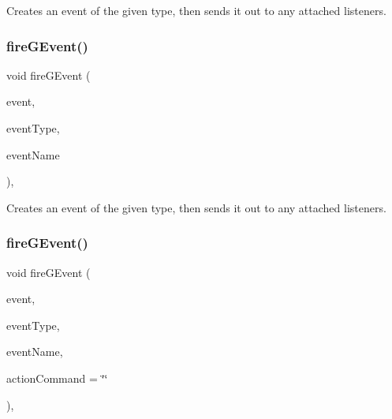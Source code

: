Creates an event of the given type, then sends it out to any attached listeners. 

\mbox{\label{classsgl_1_1GObservable_abb0b2f66ba39211cb5d7615e9d1c04e2}} 
\subsubsection{\texorpdfstring{fire\+G\+Event()}{fireGEvent()}\hspace{0.1cm}{\footnotesize\ttfamily [3/8]}}
{\footnotesize\ttfamily void fire\+G\+Event (\begin{DoxyParamCaption}\item[{Q\+Key\+Event $\ast$}]{event,  }\item[{\mbox{\hyperlink{namespacesgl_a2628ea8d12e8b2563c32f05dc7fff6fa}{Event\+Type}}}]{event\+Type,  }\item[{const std\+::string \&}]{event\+Name }\end{DoxyParamCaption})\hspace{0.3cm}{\ttfamily [protected]}, {\ttfamily [virtual]}}



Creates an event of the given type, then sends it out to any attached listeners. 

\mbox{\label{classsgl_1_1GObservable_a119318675d2165bdf7dd853aaf881d4b}} 
\subsubsection{\texorpdfstring{fire\+G\+Event()}{fireGEvent()}\hspace{0.1cm}{\footnotesize\ttfamily [4/8]}}
{\footnotesize\ttfamily void fire\+G\+Event (\begin{DoxyParamCaption}\item[{Q\+Mouse\+Event $\ast$}]{event,  }\item[{\mbox{\hyperlink{namespacesgl_a2628ea8d12e8b2563c32f05dc7fff6fa}{Event\+Type}}}]{event\+Type,  }\item[{const std\+::string \&}]{event\+Name,  }\item[{const std\+::string \&}]{action\+Command = {\ttfamily \char`\"{}\char`\"{}} }\end{DoxyParamCaption})\hspace{0.3cm}{\ttfamily [protected]}, {\ttfamily [virtual]}}



